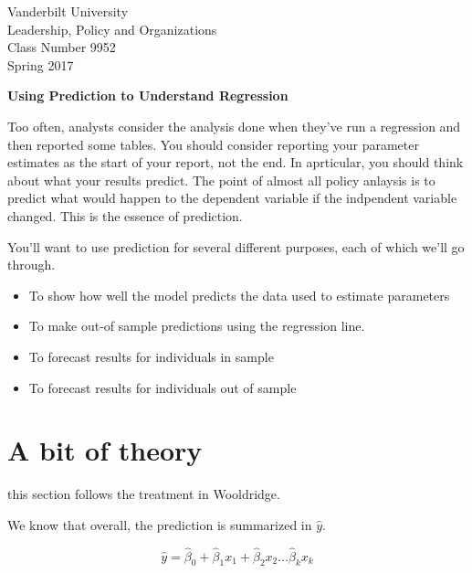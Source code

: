\documentclass[12pt]{article}
\begin{document}
\thispagestyle{empty}%

\setlength{\parskip}{1ex plus 0.5ex minus 0.2ex}

\setcounter{secnumdepth}{-2}

\begin{flushleft}
Vanderbilt University\\Leadership, Policy and Organizations\\Class Number 9952\\ Spring 2017\\
\end{flushleft}

\begin{center}
  \textbf{Using Prediction to Understand Regression}
\end{center}


Too often, analysts consider the analysis done when they've run a
regression and then reported some tables. You should consider
reporting your parameter estimates as the start of your report, not
the end. In aprticular, you should think about what your results
predict. The point of almost all policy anlaysis is to predict what
would happen to the dependent variable if the indpendent variable
changed. This is the essence of prediction. 

You'll want to use prediction for several different purposes, each of
which we'll go through.

\begin{itemize}
\item To show how well the model predicts the data used to estimate
  parameters
\item To make out-of sample predictions using the regression line.
\item To forecast results for individuals in sample
\item To forecast results for individuals out of sample
\end{itemize}



\section{A bit of theory}
\label{sec:bit-theory}

this section follows the treatment in Wooldridge. 

We know that overall, the prediction is summarized in $\hat{y}$. 

\begin{equation*}
  \hat{y}=\hat{\beta}_0+\hat{\beta}_1 x_1+ \hat{\beta}_2 x_2 \ldots \hat{\beta}_k x_k
\end{equation*}
\end{document}
